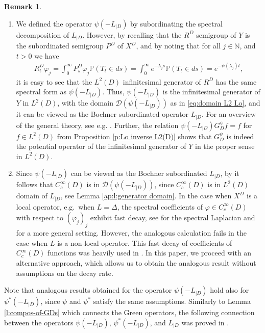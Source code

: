 \documentclass[12pt,a4paper,onecolumn]{article}
\theoremstyle{definition}
\newtheorem{rem}[thm]{Remark}
\newcommand{\N}{\mathbb{N}}
\newcommand{\p}{\mathds{P}}
\newcommand{\1}{\mathbf 1}
\newcommand{\DD}{\mathcal{D}}
\newcommand{\Lbase}{L_{|D}}
\newcommand{\Lo}{\psi(-L_{|D})}
\newcommand{\Los}{\psi^*(-L_{|D})}
\newcommand{\GDP}{G_D^\psi}
\numberwithin{equation}{section}
\begin{document}
	\begin{rem}\label{r:infty-gener}
    \begin{enumerate}
        \item[(i)]
        We defined the operator $\Lo$ by subordinating the spectral decomposition of $\Lbase$. However, by recalling that the $R^D$ semigroup of $Y$ is the subordinated semigroup $P^D$ of $X^D$, and by noting that for all $j\in \N$, and  $t>0$ we have
        \begin{align*}
            R^D_t \varphi_j=\int_0^\infty P^D_s \varphi_j \p(T_t\in ds)=\int_0^\infty e^{-\lambda_j s}\p(T_t\in ds)=e^{-\psi(\lambda_j)t},
        \end{align*}
        it is easy to see that the $L^2(D)$ infinitesimal generator of $R^D$ has the same spectral form as $\Lo$. Thus, $\Lo$ is the infinitesimal generator of $Y$ in $L^2(D)$, with the domain $\DD( \Lo)$ as in \eqref{eq:domain L2 Lo}, and it can be viewed as the Bochner subordinated operator $\Lbase$. For an overview of the general theory, see e.g. \cite[Chapter 13]{bernstein}.  Further, the relation $\Lo \GDP f=f$ for $f\in L^2(D)$ from Proposition \ref{p:Lo inverse L2(D)} shows that $\GDP$ is indeed the potential operator of the infinitesimal generator of 
        $Y$ in the proper sense in $L^2(D)$.

        \item[(ii)]
        Since $\Lo$ can be viewed as the Bochner subordinated $\Lbase$, by  \cite[Theorem 13.6]{bernstein} it follows that $C_c^\infty(D)$ is in $\DD(\psi(-\Lbase))$, since $C_c^\infty(D)$ is in $L^2(D)$ domain of $\Lbase$, see  Lemma \ref{ap:l:generator domain}. In the case when $X^D$ is a local operator, e.g.~when $L=\Delta$, the spectral coefficients of $\varphi\in C_c^\infty(D)$ with respect to $(\varphi_j)_j$ exhibit fast decay, see \cite[Eq. (22)]{AbaDup-Nonhomog2017} for the spectral Laplacian and \cite[Eq. (2.26)]{Bio23cpaa} for a more general setting. However, the analogous calculation fails in the case when $L$ is a non-local operator. This fast decay of coefficients of $C_c^\infty(D)$ functions was heavily used in \cite{AbaDup-Nonhomog2017,Bio23cpaa}. In this paper, we proceed with an alternative approach, which allows us to obtain the analogous result without assumptions on the decay rate.  
    \end{enumerate}      
	\end{rem}

    Note that analogous results obtained for the operator $\Lo$ hold also for $\Los$, since $\psi$ and $\psi^*$ satisfy the same assumptions. Similarly to Lemma \ref{l:compos-of-GDs} which connects the Green operators, the following connection between the operators $\Lo$, $\Los$, and $\Lbase$ was proved in \cite[Corollary 13.25]{bernstein}.
    
\end{document}
